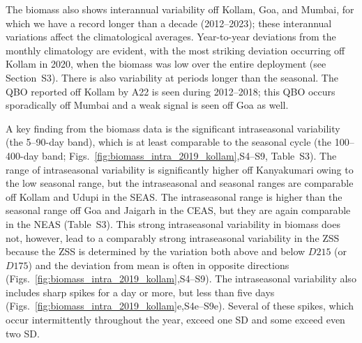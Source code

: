 \documentclass[authoryear,review,11pt]{elsarticle}
\providecommand{\DIFaddtex}[1]{{\protect\color{blue}\uwave{#1}}} %
\providecommand{\DIFaddbegin}{} %
\providecommand{\DIFaddend}{} %
\providecommand{\DIFadd}[1]{\texorpdfstring{\DIFaddtex{#1}}{#1}} %
\begin{document}
The biomass also shows interannual variability off Kollam, Goa, and Mumbai, for which we have a record longer than a decade (2012--2023); these interannual variations affect the climatological averages. Year-to-year deviations from the monthly climatology are evident, with the most striking deviation occurring off Kollam in 2020, when the biomass was low over the entire deployment (see Section~S3\DIFaddbegin \DIFadd{, Fig.~S10}\DIFaddend ). There is also variability at periods longer than the seasonal. The QBO reported off Kollam by A22 is seen during 2012--2018; this QBO occurs sporadically off Mumbai and a weak signal is seen off Goa as well. 

A key finding from the biomass data is the significant intraseasonal variability (the 5--90-day band), which is at least comparable to the seasonal cycle (the 100--400-day band; Figs.~\ref{fig:biomass_intra_2019_kollam},S4--S9, Table~S3). The range of intraseasonal variability is significantly higher off Kanyakumari owing to the low seasonal range, but the intraseasonal and seasonal ranges are comparable off Kollam and Udupi in the SEAS.  The intraseasonal range is higher than the seasonal range off Goa and Jaigarh in the CEAS, but they are again comparable in the NEAS (Table~S3). This strong intraseasonal variability in biomass does not, however, lead to a comparably strong intraseasonal variability in the ZSS because the ZSS is determined by the variation both above and below $D215$ (or $D175$) and the deviation from mean is often in opposite directions (Figs.~\ref{fig:biomass_intra_2019_kollam},S4--S9). The intraseasonal variability also includes sharp spikes for a day or more, but less than five days (Figs.~\ref{fig:biomass_intra_2019_kollam}e,S4e--S9e).  Several of these spikes, which occur intermittently throughout the year, exceed one SD and some exceed even two SD.

 

\end{document}
